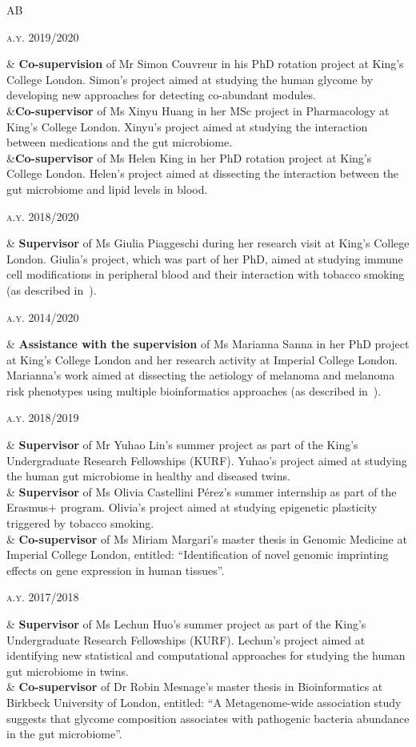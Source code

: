 \documentclass[a4paper,10pt]{article}
\newenvironment{doubletablelist}
{
	\vspace{-0.2cm}
	\begin{longtable}[!h]{AB}}{\end{longtable}
}
\newcommand{\dtlist}[2]{
\hspace{-3cm}
\noindent
	\begin{minipage}{0.22\textwidth}
	\begin{flushright}
	\textsc{#1}
	\end{flushright}
	\end{minipage}
	& #2\\[0.2cm]
}
\begin{document}
\begin{doubletablelist}
	\dtlist{a.y. 2019/2020}{\textbf{Co-supervision} of Mr Simon Couvreur in his PhD rotation project at King's College London. Simon's project aimed at studying the human glycome by developing new approaches for detecting co-abundant modules.\\
		&\textbf{Co-supervisor} of Ms Xinyu Huang in her MSc project in Pharmacology at King's College London. Xinyu's project aimed at studying the interaction between medications and the gut microbiome.\\
		&\textbf{Co-supervisor} of Ms Helen King in her PhD rotation project at King's College London. Helen's project aimed at dissecting the interaction between the gut microbiome and lipid levels in blood.}
	\dtlist{a.y. 2018/2020}{\textbf{Supervisor} of Ms Giulia Piaggeschi during her research visit at King's College London. Giulia's project, which was part of her PhD, aimed at studying immune cell modifications in peripheral blood and their interaction with tobacco smoking (as described in~\cite{Pia21}).}
	\dtlist{a.y. 2014/2020}{\textbf{Assistance with the supervision} of Ms Marianna Sanna in her PhD project at King's College London and her research activity at Imperial College London. Marianna's work aimed at dissecting the aetiology of melanoma and melanoma risk phenotypes using multiple bioinformatics approaches (as described in~\cite{Rib16,Duf17,Vis19a,Vis20,San20}).\\
	\dtlist{a.y. 2018/2019}{\textbf{Supervisor} of Mr Yuhao Lin's summer project as part of the King's Undergraduate Research Fellowships (KURF). Yuhao's project aimed at studying the human gut microbiome in healthy and diseased twins.}
			& \textbf{Supervisor} of Ms Olivia Castellini P\'erez's summer internship as part of the Erasmus+ program. Olivia's project aimed at studying epigenetic plasticity triggered by tobacco smoking.\\
			& \textbf{Co-supervisor} of Ms Miriam Margari's master thesis in Genomic Medicine at Imperial College London, entitled: ``Identification of novel genomic imprinting effects on gene expression in human tissues''.}
	\dtlist{a.y. 2017/2018}{\textbf{Supervisor} of Ms Lechun Huo's summer project as part of the King's Undergraduate Research Fellowships (KURF). Lechun's project aimed at identifying new statistical and computational approaches for studying the human gut microbiome in twins.\\
		& \textbf{Co-supervisor} of Dr Robin Mesnage's master thesis in Bioinformatics at Birkbeck University of London, entitled: ``A Metagenome-wide association study suggests that glycome composition associates with pathogenic bacteria abundance in the gut microbiome''.}

\end{doubletablelist}
\end{document}

